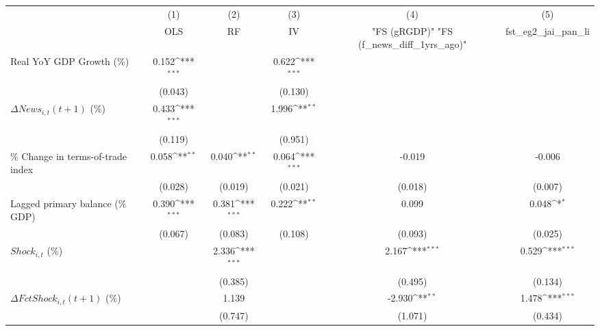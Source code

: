{
\def\sym#1{\ifmmode^{#1}\else\(^{#1}\)\fi}
\begin{tabular}{l*{5}{c}}
\toprule
                    &\multicolumn{1}{c}{(1)}&\multicolumn{1}{c}{(2)}&\multicolumn{1}{c}{(3)}&\multicolumn{1}{c}{(4)}&\multicolumn{1}{c}{(5)}\\
                    &\multicolumn{1}{c}{OLS}&\multicolumn{1}{c}{RF}&\multicolumn{1}{c}{IV}&\multicolumn{1}{c}{ "FS (gRGDP)"  "FS (f_news_diff_1yrs_ago)" }&\multicolumn{1}{c}{fst_eg2_jai_pan_li}\\
\midrule
Real YoY GDP Growth (\%)&       0.152\sym{***}&                     &       0.622\sym{***}&                     &                     \\
                    &     (0.043)         &                     &     (0.130)         &                     &                     \\
\addlinespace
$ \Delta News_{i,t}(t+1)$ (\%)&       0.433\sym{***}&                     &       1.996\sym{**} &                     &                     \\
                    &     (0.119)         &                     &     (0.951)         &                     &                     \\
\addlinespace
\% Change in terms-of-trade index&       0.058\sym{**} &       0.040\sym{**} &       0.064\sym{***}&      -0.019         &      -0.006         \\
                    &     (0.028)         &     (0.019)         &     (0.021)         &     (0.018)         &     (0.007)         \\
\addlinespace
Lagged primary balance (\% GDP)&       0.390\sym{***}&       0.381\sym{***}&       0.222\sym{**} &       0.099         &       0.048\sym{*}  \\
                    &     (0.067)         &     (0.083)         &     (0.108)         &     (0.093)         &     (0.025)         \\
\addlinespace
$ Shock_{i,t}$ (\%) &                     &       2.336\sym{***}&                     &       2.167\sym{***}&       0.529\sym{***}\\
                    &                     &     (0.385)         &                     &     (0.495)         &     (0.134)         \\
\addlinespace
$ \Delta FctShock_{i,t}(t+1)$ (\%)&                     &       1.139         &                     &      -2.930\sym{**} &       1.478\sym{***}\\
                    &                     &     (0.747)         &                     &     (1.071)         &     (0.434)         \\

\end{tabular}}
